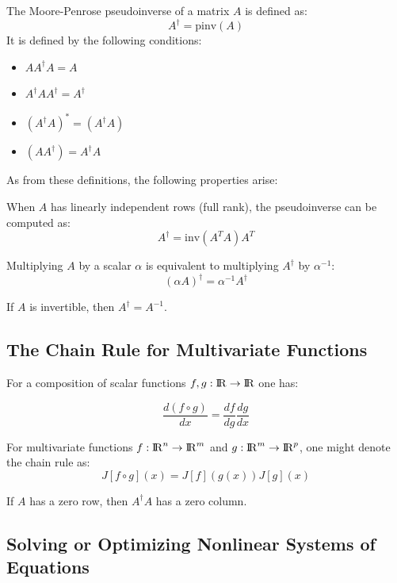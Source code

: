 \documentclass[10pt,journal,compsoc]{IEEEtran}
\newcommand{\reals}{{\rm I\!R}}
\begin{document}
The Moore-Penrose pseudoinverse of a matrix $A$ is defined as:
\begin{equation}
	A^{\dagger} = \text{pinv}(A)
\end{equation}
It is defined by the following conditions:

\begin{itemize}
\item $AA^{\dagger}A = A$
\item $A^{\dagger}AA^{\dagger} = A^{\dagger}$
\item $\left(A^{\dagger}A\right)^* = \left(A^{\dagger}A\right)$
\item $\left(AA^{\dagger}\right) = A^{\dagger} A$
\end{itemize}

As from these definitions, the following properties arise:

When $A$ has linearly independent rows (full rank), the pseudoinverse can be computed as:
\begin{equation}
	A^{\dagger} = \text{inv}(A^T A) A^T
\end{equation}

Multiplying $A$ by a scalar $\alpha$ is equivalent to multiplying $A^{\dagger}$ by $\alpha^{-1}$:
\begin{equation}
	\left(\alpha A\right) ^{\dagger} = \alpha^{-1} A^{\dagger}
\end{equation}

If $A$ is invertible, then $A^{\dagger}=A^{-1}$.

\subsection{The Chain Rule for Multivariate Functions}
For a composition of scalar functions $f, g:\reals \rightarrow \reals$ one has:

\begin{equation}
	\frac{d (f \circ g)}{d x} = \frac{d f}{d g} \frac{d g}{d x}
\end{equation}

For multivariate functions $f :\reals^n \rightarrow \reals ^m$ and $g: \reals^m \rightarrow \reals ^p$, one might denote the chain rule as:
\begin{equation}
	J[f \circ g](x) = J[f](g(x)) J[g](x)
\end{equation}

If $A$ has a zero row, then $A^{\dagger}A$ has a zero column.


\subsection{Solving or Optimizing Nonlinear Systems of Equations}\label{sec:methods}
\end{document}

